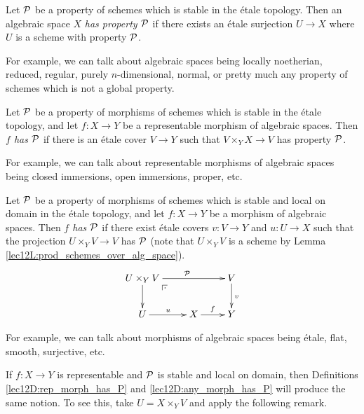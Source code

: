  \begin{definition} \label{lec12D:alg_space_has_P}
   Let $\P$ be a property of schemes which is stable in the \'etale topology. Then an
   algebraic space $X$ \emph{has property $\P$} if there exists an \'etale surjection
   $U\to X$ where $U$ is a scheme with property $\P$.
 \end{definition}
 For example, we can talk about algebraic spaces being locally noetherian, reduced,
 regular, purely $n$-dimensional, normal, or pretty much any property of schemes which is
 not a global property.
 \begin{definition} \label{lec12D:rep_morph_has_P}
   Let $\P$ be a property of morphisms of schemes which is stable in the \'etale
   topology, and let $f:X\to Y$ be a representable morphism of algebraic spaces. Then
   \emph{$f$ has $\P$} if there is an \'etale cover $V\to Y$ such that $V\times_Y X\to V$
   has property $\P$.
 \end{definition}
 For example, we can talk about representable morphisms of algebraic spaces being closed
 immersions, open immersions, proper, etc.
 \begin{definition}\label{lec12D:any_morph_has_P}
   Let $\P$ be a property of morphisms of schemes which is stable and local on domain in
   the \'etale topology, and let $f:X\to Y$ be a morphism of algebraic spaces. Then
   \emph{$f$ has $\P$} if there exist \'etale covers $v:V\to Y$ and $u:U\to X$ such that
   the projection $U\times_Y V\to V$ has $\P$ (note that $U\times_Y V$ is a scheme by
   Lemma \ref{lec12L:prod_schemes_over_alg_space}).
   \[\xymatrix{
    U\times_Y V \ar[rr]^\P \ar[d] \ar@{}[drr]|(.25)\pb & & V \ar[d]^v \\
    U\ar[r]^u & X\ar[r]^f & Y
   }\]
 \end{definition}
 For example, we can talk about morphisms of algebraic spaces being \'etale, flat,
 smooth, surjective, etc.
 \begin{remark}
   If $f:X\to Y$ is representable and $\P$ is stable and local on domain, then
   Definitions \ref{lec12D:rep_morph_has_P} and \ref{lec12D:any_morph_has_P} will produce
   the same notion. To see this, take $U=X\times_Y V$ and apply the following remark.
 \end{remark}
